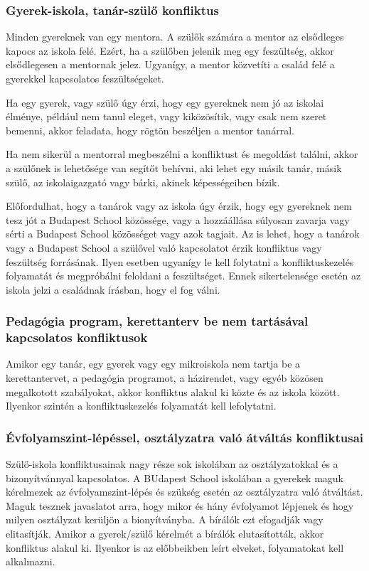 \subsubsection{Gyerek-iskola, tanár-szülő
      konfliktus}

Minden gyereknek van egy mentora. A szülők számára a mentor az
elsődleges kapocs az iskola felé. Ezért, ha a szülőben jelenik meg egy
feszültség, akkor elsődlegesen a mentornak jelez. Ugyanígy, a mentor
közvetíti a család felé a gyerekkel kapcsolatos feszültségeket.

Ha egy gyerek, vagy szülő úgy érzi, hogy egy gyereknek nem jó az iskolai
élménye, például nem tanul eleget, vagy kiközösítik, vagy csak nem
szeret bemenni, akkor feladata, hogy rögtön beszéljen a mentor tanárral.

Ha nem sikerül a mentorral megbeszélni a konfliktust és megoldást találni,
akkor a szülőnek is lehetősége van segítőt behívni, aki lehet egy másik tanár,
másik szülő, az iskolaigazgató vagy bárki, akinek képességeiben bízik.

Előfordulhat, hogy a tanárok vagy az iskola úgy érzik, hogy egy
gyereknek nem tesz jót a Budapest School közössége, vagy a hozzáállása
súlyosan zavarja vagy sérti a Budapest School közösséget vagy azok
tagjait. Az is lehet, hogy a tanárok vagy a Budapest School a szülővel
való kapcsolatot érzik konfliktus vagy feszültség forrásának. Ilyen
esetben ugyanígy le kell folytatni a konfliktuskezelés folyamatát és
megpróbálni feloldani a feszültséget. Ennek sikertelensége esetén az
iskola jelzi a családnak írásban, hogy el fog válni.

\subsubsection{Pedagógia program, kerettanterv be nem tartásával
      kapcsolatos konfliktusok}

Amikor egy tanár, egy gyerek vagy egy mikroiskola nem tartja be a
kerettantervet, a pedagógia programot, a házirendet, vagy egyéb közösen
megalkotott szabályokat, akkor konfliktus alakul ki közte és az iskola
között. Ilyenkor szintén a konfliktuskezelés folyamatát kell
lefolytatni.

\subsubsection{Évfolyamszint-lépéssel, osztályzatra való átváltás konfliktusai}
Szülő-iskola konfliktusainak nagy része sok iskolában az osztályzatokkal és a
bizonyítvánnyal kapcsolatos.
A BUdapest School iskolában a gyerekek maguk kérelmezek az évfolyamszint-lépés
és szükség esetén az osztályzatra való átváltást. Maguk tesznek javaslatot
arra, hogy mikor és hány évfolyamot lépjenek és hogy milyen osztályzat kerüljön
a bionyítványba. A bírálók ezt efogadják vagy elitasítják. Amikor a
gyerek/szülő kérelmét a bírálók elutasították, akkor konfliktus alakul ki.
Ilyenkor is az előbbeikben leírt elveket, folyamatokat kell alkalmazni.